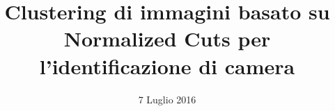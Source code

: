 \documentclass{beamer}
\author{}
\title{\huge Clustering di immagini basato su Normalized Cuts per l’identificazione di camera}
\date{7 Luglio 2016}
\begin{document}
\titlepageframe







\end{document}
